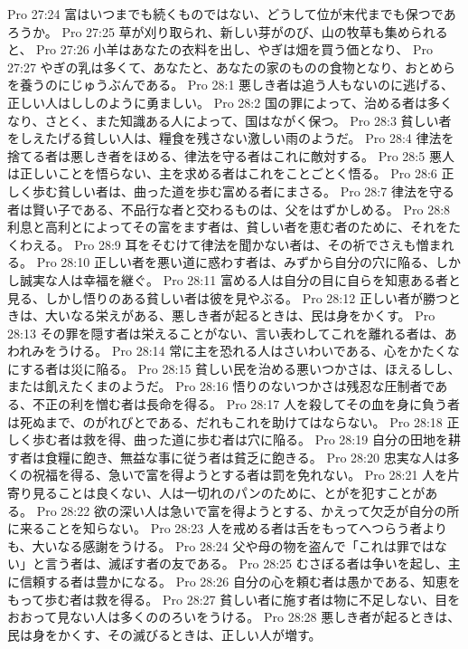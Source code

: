 Pro 27:24  富はいつまでも続くものではない、どうして位が末代までも保つであろうか。
Pro 27:25  草が刈り取られ、新しい芽がのび、山の牧草も集められると、
Pro 27:26  小羊はあなたの衣料を出し、やぎは畑を買う価となり、
Pro 27:27  やぎの乳は多くて、あなたと、あなたの家のものの食物となり、おとめらを養うのにじゅうぶんである。
Pro 28:1  悪しき者は追う人もないのに逃げる、正しい人はししのように勇ましい。
Pro 28:2  国の罪によって、治める者は多くなり、さとく、また知識ある人によって、国はながく保つ。
Pro 28:3  貧しい者をしえたげる貧しい人は、糧食を残さない激しい雨のようだ。
Pro 28:4  律法を捨てる者は悪しき者をほめる、律法を守る者はこれに敵対する。
Pro 28:5  悪人は正しいことを悟らない、主を求める者はこれをことごとく悟る。
Pro 28:6  正しく歩む貧しい者は、曲った道を歩む富める者にまさる。
Pro 28:7  律法を守る者は賢い子である、不品行な者と交わるものは、父をはずかしめる。
Pro 28:8  利息と高利とによってその富をます者は、貧しい者を恵む者のために、それをたくわえる。
Pro 28:9  耳をそむけて律法を聞かない者は、その祈でさえも憎まれる。
Pro 28:10  正しい者を悪い道に惑わす者は、みずから自分の穴に陥る、しかし誠実な人は幸福を継ぐ。
Pro 28:11  富める人は自分の目に自らを知恵ある者と見る、しかし悟りのある貧しい者は彼を見やぶる。
Pro 28:12  正しい者が勝つときは、大いなる栄えがある、悪しき者が起るときは、民は身をかくす。
Pro 28:13  その罪を隠す者は栄えることがない、言い表わしてこれを離れる者は、あわれみをうける。
Pro 28:14  常に主を恐れる人はさいわいである、心をかたくなにする者は災に陥る。
Pro 28:15  貧しい民を治める悪いつかさは、ほえるしし、または飢えたくまのようだ。
Pro 28:16  悟りのないつかさは残忍な圧制者である、不正の利を憎む者は長命を得る。
Pro 28:17  人を殺してその血を身に負う者は死ぬまで、のがれびとである、だれもこれを助けてはならない。
Pro 28:18  正しく歩む者は救を得、曲った道に歩む者は穴に陥る。
Pro 28:19  自分の田地を耕す者は食糧に飽き、無益な事に従う者は貧乏に飽きる。
Pro 28:20  忠実な人は多くの祝福を得る、急いで富を得ようとする者は罰を免れない。
Pro 28:21  人を片寄り見ることは良くない、人は一切れのパンのために、とがを犯すことがある。
Pro 28:22  欲の深い人は急いで富を得ようとする、かえって欠乏が自分の所に来ることを知らない。
Pro 28:23  人を戒める者は舌をもってへつらう者よりも、大いなる感謝をうける。
Pro 28:24  父や母の物を盗んで「これは罪ではない」と言う者は、滅ぼす者の友である。
Pro 28:25  むさぼる者は争いを起し、主に信頼する者は豊かになる。
Pro 28:26  自分の心を頼む者は愚かである、知恵をもって歩む者は救を得る。
Pro 28:27  貧しい者に施す者は物に不足しない、目をおおって見ない人は多くののろいをうける。
Pro 28:28  悪しき者が起るときは、民は身をかくす、その滅びるときは、正しい人が増す。
